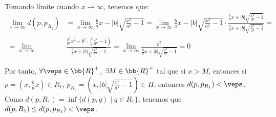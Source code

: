 \documentclass[12pt]{article}
\begin{document}
\begin{ejercicio}[3 puntos]
        Tomando límite cuando $x\to \infty$, tenemos que:
        \begin{align*}
            \lim_{x\to \infty} d(p, p_{R_1})
            &= \lim_{x\to \infty} \frac{b}{a} x - |b|\sqrt{\frac{x^2}{a^2}-1}
            = \lim_{x\to \infty} \frac{b}{a} x - |b|\sqrt{\frac{x^2}{a^2}-1}
            \cdot \frac{\frac{b}{a} x + |b|\sqrt{\frac{x^2}{a^2}-1}}{\frac{b}{a} x + |b|\sqrt{\frac{x^2}{a^2}-1}}
            =\\= \lim_{x\to \infty} &\frac{\frac{b^2}{a^2} x^2 - b^2\cdot \left(\frac{x^2}{a^2}-1\right)}{\frac{b}{a} x + |b|\sqrt{\frac{x^2}{a^2}-1}}
            = \lim_{x\to \infty} \frac{b^2}{\frac{b}{a} x + |b|\sqrt{\frac{x^2}{a^2}-1}}=0
        \end{align*}

        Por tanto, $\forall \veps\in \bb{R}^+$, $\exists M \in \bb{R}^+$ tal que si $x>M$, entonces si $p=\left(x, \frac{b}{a}x\right)\in R_1$, $p_{R_1}=\left(x, |b|\sqrt{\frac{x^2}{a^1}-1}\right)\in H$, entonces $d(p, p_{R_1})<\veps$.
        Como $d(p, R_1)=\inf\{d(p, q)\mid q\in R_1\}$, tenemos que $d(p, R_1)\leq d(p, p_{R_1})<\veps$.
    \end{ejercicio}
\end{document}
